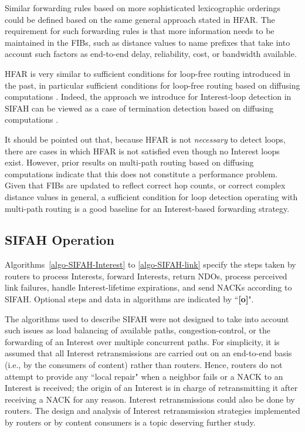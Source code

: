\documentclass{ancs15-alternate}
\begin{document}
Similar  forwarding rules based on more sophisticated lexicographic orderings
could be defined based on the same general approach  stated in HFAR.
The requirement for such forwarding rules is that more information needs to be maintained in the FIBs, such as distance values to name prefixes that take into account such factors as end-to-end delay, reliability, cost, or bandwidth available. 

HFAR is very similar to sufficient conditions for loop-free routing introduced in the past, in particular sufficient conditions for loop-free routing based on diffusing computations \cite{dual, vutukury, dual-patent}. Indeed,  the approach we introduce  for Interest-loop detection in SIFAH
can be viewed as a case of  termination detection based on  diffusing computations \cite{diffuse}.

It should be pointed out   that, because HFAR is not {\em necessary} to detect loops, there are cases in which HFAR  is not satisfied even though no Interest loops exist.  However, prior results on  multi-path routing based on 
diffusing computations \cite{dual2} indicate that this does not constitute a performance problem.
Given that FIBs are updated to reflect correct hop counts, or correct complex distance values in general,
a sufficient condition for loop detection operating with multi-path routing is a good 
baseline for an Interest-based forwarding strategy.  


\subsection{SIFAH Operation}

Algorithms~\ref{algo-SIFAH-Interest}  to \ref{algo-SIFAH-link} specify 
the steps taken by  routers to process Interests, forward Interests, return NDOs, process perceived link failures, handle Interest-lifetime expirations, and 
send NACKs according to SIFAH.  Optional steps  and data in algorithms are indicated by ``{\bf [o]}".

The algorithms used to describe SIFAH were not designed to  take into account such issues  as load balancing of available paths, congestion-control, or the forwarding of an Interest over multiple concurrent paths. 
For simplicity,  it is assumed that all Interest retransmissions are carried out on an end-to-end basis (i.e., by the consumers of content) rather than routers. Hence, routers do not attempt to provide any ``local repair" when a neighbor fails or a NACK to an Interest is received; 
the origin of an Interest is in charge of retransmitting it after receiving a NACK for any reason.
Interest retransmissions could also be done by routers.  
The design and analysis of Interest retransmission strategies implemented by routers or by content consumers  is a topic deserving further study. 
\end{document}
